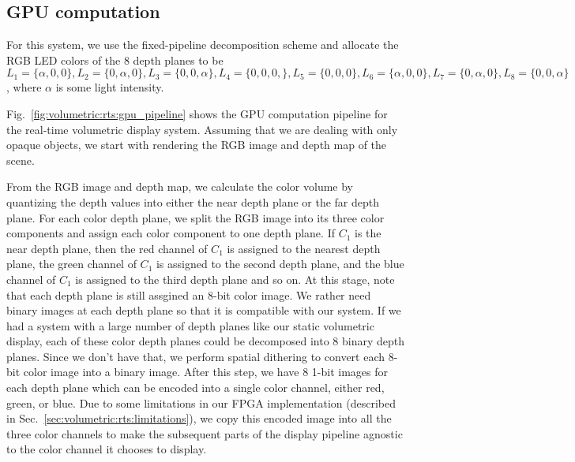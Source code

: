 \subsection{GPU computation}

For this system, we use the fixed-pipeline decomposition scheme and allocate the RGB LED colors of the 8 depth planes to be $L_1 = \{\alpha, 0, 0\}, L_2 = \{0, \alpha, 0\}, L_3 = \{0, 0, \alpha\}, L_4 = \{0, 0, 0,\}, L_5 = \{0, 0, 0\}, L_6 = \{\alpha, 0,0\}, L_7 = \{0, \alpha,0\}, L_8 = \{0, 0, \alpha\}$, where $\alpha$ is some light intensity.

Fig.~\ref{fig:volumetric:rts:gpu_pipeline} shows the GPU computation pipeline for the real-time volumetric display system. Assuming that we are dealing with only opaque objects, we start with rendering the RGB image and depth map of the scene.

From the RGB image and depth map, we calculate the color volume by quantizing the depth values into either the near depth plane or the far depth plane.
For each color depth plane, we split the RGB image into its three color components and assign each color component to one depth plane. 
If $C_1$ is the near depth plane, then the red channel of $C_1$ is assigned to the nearest depth plane, the green channel of $C_1$ is assigned to the second depth plane, and the blue channel of $C_1$ is assigned to the third depth plane and so on.
At this stage, note that each depth plane is still assgined an 8-bit color image.
We rather need binary images at each depth plane so that it is compatible with our system. 
If we had a system with a large number of depth planes like our static volumetric display, each of these color depth planes could be decomposed into 8 binary depth planes.
Since we don't have that, we perform spatial dithering to convert each 8-bit color image into a binary image. 
After this step, we have 8 1-bit images for each depth plane which can be encoded into a single color channel, either red, green, or blue.
Due to some limitations in our FPGA implementation (described in Sec.~\ref{sec:volumetric:rts:limitations}), we copy this encoded image into all the three color channels to make the subsequent parts of the display pipeline agnostic to the color channel it chooses to display.

